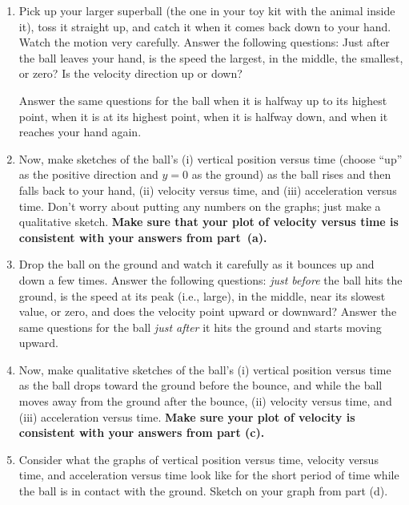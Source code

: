 \begin{exercise}
  \begin{enumerate}
  \item Pick up your larger superball (the one in your toy kit with
    the animal inside it), toss it straight up, and catch it
    when it comes back down to your hand.  Watch the motion very
    carefully.  Answer the following questions: Just after the ball
    leaves your hand, is the speed the largest, in the middle, the
    smallest, or zero? Is the velocity direction up or down?

    Answer the same questions for the ball when it is halfway up to
    its highest point, when it is at its highest point, when it is
    halfway down, and when it reaches your hand again.
 
  \item Now, make sketches of the ball's (i) vertical position versus
    time (choose ``up'' as the positive direction and $y = 0$ as the
    ground) as the ball rises and then falls back to your hand, (ii)
    velocity versus time, and (iii) acceleration versus time.  Don't
    worry about putting any numbers on the graphs; just make a
    qualitative sketch.  \textbf{Make sure that your plot of velocity
    versus time is consistent with your answers from part~(a).}

  \item Drop the ball on the ground and watch it carefully as it
    bounces up and down a few times.  Answer the following questions:
    \emph{just before} the ball hits the ground, is the speed at its
    peak (i.e., large), in the middle, near its slowest value, or
    zero, and does the velocity point upward or downward?  Answer the
    same questions for the ball \emph{just after} it hits the ground
    and starts moving upward.

  \item Now, make qualitative sketches of the ball's (i) vertical
    position versus time as the ball drops toward the ground before
    the bounce, and while the ball moves away from the ground after
    the bounce, (ii) velocity versus time, and (iii) acceleration
    versus time.  \textbf{Make sure your plot of velocity is consistent 
    with your answers from part (c).}

  \item Consider what the graphs of vertical position versus time,
    velocity versus time, and acceleration versus time look like for
    the short period of time while the ball is in contact with the
    ground.  Sketch on your graph from part (d).
 
  \end{enumerate}
  \label{prob:bouncing_ball}
\end{exercise}


